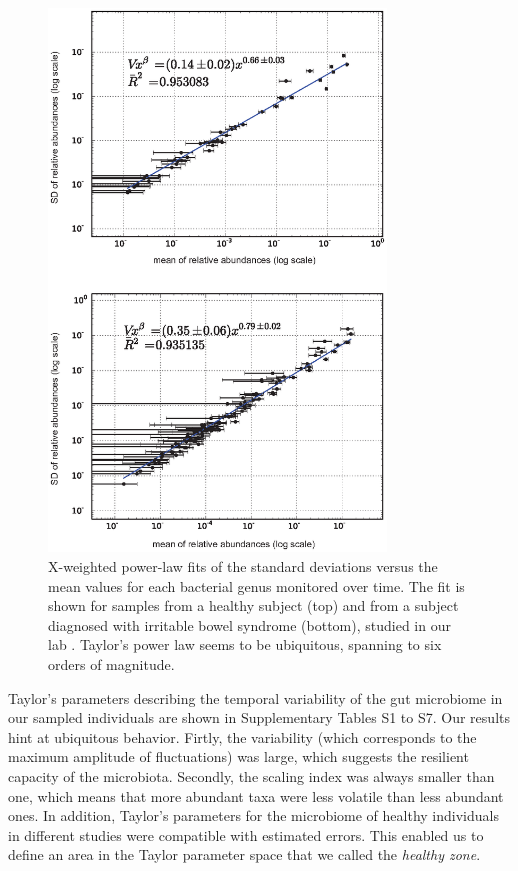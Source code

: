 \begin{figure}
	\centering
	\vspace*{-15mm} %
	\includegraphics[width=0.8\textwidth]{figs/Fig1.eps}
	\caption{X-weighted power-law fits of the standard deviations versus the mean values for each bacterial genus monitored over time. The fit is shown for samples from a healthy subject (top) and from a subject diagnosed with irritable bowel syndrome (bottom), studied in our lab \cite{IBS}. Taylor's power law seems to be ubiquitous, spanning to six orders of magnitude.}
	\label{fig:main1}
\end{figure}

Taylor's parameters describing the temporal variability of the gut microbiome in our sampled individuals are shown in Supplementary Tables S1 to S7. Our results hint at ubiquitous behavior. Firtly, the variability (which corresponds to the maximum amplitude of fluctuations) was large, which suggests the resilient capacity of the microbiota. Secondly, the scaling index was always smaller than one, which means that more abundant taxa were less volatile than less abundant ones. In addition, Taylor's parameters for the microbiome of healthy individuals in different studies were compatible with estimated errors. This enabled us to define an area in the Taylor parameter space that we called the \emph{healthy zone}. 

